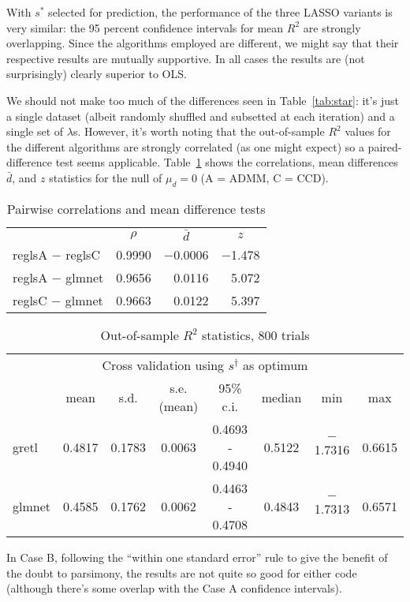 \documentclass{article}
\begin{document}
With $s^*$ selected for prediction, the performance of the three LASSO
variants is very similar: the 95 percent confidence intervals for mean
$R^2$ are strongly overlapping.  Since the algorithms employed are
different, we might say that their respective results are mutually
supportive. In all cases the results are (not surprisingly) clearly
superior to OLS.

We should not make too much of the differences seen in
Table~\ref{tab:star}: it's just a single dataset (albeit randomly
shuffled and subsetted at each iteration) and a single set of
$\lambda$s. However, it's worth noting that the out-of-sample $R^2$
values for the different algorithms are strongly correlated (as one
might expect) so a paired-difference test seems
applicable. Table~\ref{tab:z} shows the correlations, mean differences
$\bar{d}$, and $z$ statistics for the null of $\mu_d = 0$ (A = ADMM, C
= CCD).

\begin{table}[htbp]
  \centering
  \begin{tabular}{lcrr}
    & \multicolumn{1}{c}{$\rho$} & \multicolumn{1}{c}{$\bar{d}$} &
        \multicolumn{1}{c}{$z$} \\
    reglsA $-$ reglsC & 0.9990 & $-$0.0006 & $-$1.478 \\
    reglsA $-$ glmnet & 0.9656 &    0.0116 & 5.072 \\
    reglsC $-$ glmnet & 0.9663 &    0.0122 & 5.397
  \end{tabular}
  \caption{Pairwise correlations and mean difference tests}
  \label{tab:z}
\end{table}


\begin{table}[htbp]
  \centering
  \begin{tabular}{lccccccc}
    \multicolumn{8}{c}{Cross validation using $s^{\dagger}$ as optimum} \\
 & mean & s.d. & s.e.(mean) & 95\% c.i. & median & min & max \\
\textsf{gretl} & 0.4817 & 0.1783 & 0.0063 & 0.4693 - 0.4940 & 0.5122 & $-$1.7316 & 0.6615 \\
\textsf{glmnet} & 0.4585 & 0.1762 & 0.0062 & 0.4463 - 0.4708 & 0.4843 & $-$1.7313 & 0.6571 \\
  \end{tabular}
  \caption{Out-of-sample $R^2$ statistics, 800 trials}
  \label{tab:dagger}
\end{table}

In Case B, following the ``within one standard error'' rule to give
the benefit of the doubt to parsimony, the results are not quite so
good for either code (although there's some overlap with the Case A
confidence intervals).
\end{document}
